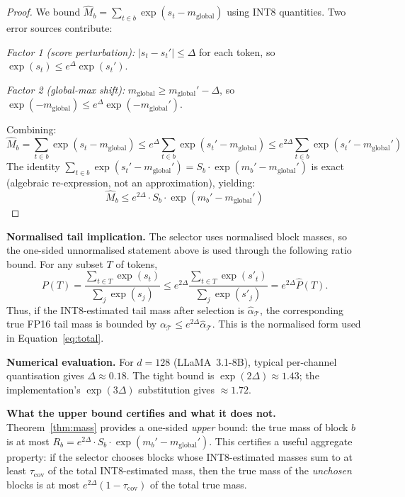 \documentclass[11pt,a4paper]{article}
\theoremstyle{definition}
\theoremstyle{remark}
\begin{document}
\begin{proof}
We bound $\hat{M}_b = \sum_{t \in b} \exp(s_t - m_{\mathrm{global}})$ using INT8 quantities.  Two error sources contribute:

\emph{Factor 1 (score perturbation):}  $|s_t - s_t'| \leq \Delta$ for each token, so $\exp(s_t) \leq e^{\Delta} \exp(s_t')$.

\emph{Factor 2 (global-max shift):}  $m_{\mathrm{global}} \geq m_{\mathrm{global}}' - \Delta$, so $\exp(-m_{\mathrm{global}}) \leq e^{\Delta} \exp(-m_{\mathrm{global}}')$.

Combining:
\[
  \hat{M}_b = \sum_{t \in b}\exp(s_t - m_{\mathrm{global}}) \leq e^{\Delta} \sum_{t \in b}\exp(s_t' - m_{\mathrm{global}}) \leq e^{2\Delta} \sum_{t \in b}\exp(s_t' - m_{\mathrm{global}}')
\]
The identity $\sum_{t \in b}\exp(s_t' - m_{\mathrm{global}}') = S_b \cdot \exp(m_b' - m_{\mathrm{global}}')$ is exact (algebraic re-expression, not an approximation), yielding:
\[
  \hat{M}_b \leq e^{2\Delta} \cdot S_b \cdot \exp(m_b' - m_{\mathrm{global}}')
\]
\end{proof}

\textbf{Normalised tail implication.}  The selector uses normalised block masses, so the one-sided unnormalised statement above is used through the following ratio bound.  For any subset $T$ of tokens,
\begin{equation}
  P(T) = \frac{\sum_{t\in T}\exp(s_t)}{\sum_j \exp(s_j)}
  \leq e^{2\Delta}
  \frac{\sum_{t\in T}\exp(s'_t)}{\sum_j \exp(s'_j)}
  = e^{2\Delta}\hat{P}(T).
\end{equation}
Thus, if the INT8-estimated tail mass after selection is $\hat{\alpha}_{\mathcal{T}}$, the corresponding true FP16 tail mass is bounded by $\alpha_{\mathcal{T}} \leq e^{2\Delta}\hat{\alpha}_{\mathcal{T}}$.  This is the normalised form used in Equation~\eqref{eq:total}.

\textbf{Numerical evaluation.}  For $d = 128$ (LLaMA~3.1-8B), typical per-channel quantisation gives $\Delta \approx 0.18$.  The tight bound is $\exp(2\Delta) \approx 1.43$; the implementation's $\exp(3\Delta)$ substitution gives $\approx 1.72$.

\textbf{What the upper bound certifies and what it does not.}  Theorem~\ref{thm:mass} provides a one-sided \emph{upper} bound: the true mass of block $b$ is at most $R_b = e^{2\Delta} \cdot S_b \cdot \exp(m_b' - m_{\mathrm{global}}')$.  This certifies a useful aggregate property: if the selector chooses blocks whose INT8-estimated masses sum to at least $\tau_{\mathrm{cov}}$ of the total INT8-estimated mass, then the true mass of the \emph{unchosen} blocks is at most $e^{2\Delta} (1 - \tau_{\mathrm{cov}})$ of the total true mass.
\end{document}
